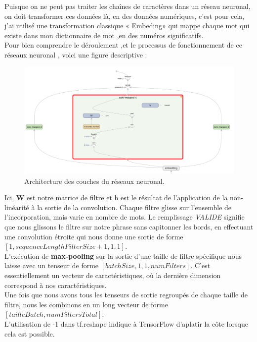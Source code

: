 Puisque on ne peut pas traiter les chaînes de caractères dans un réseau neuronal, on doit transformer ces données là, en des données numériques, c’est pour cela, j’ai utilisé une transformation classique « Embeding» qui mappe chaque mot qui existe dans mon dictionnaire de mot ,en des numéros significatifs.\\[0.2cm]
Pour bien comprendre le déroulement ,et le processus de fonctionnement de ce réseaux neuronal , voici une figure descriptive :

\begin{figure}[H]
	\begin{center}
	\includegraphics[width=\linewidth]{Images/cnn2.png}
	\end{center}
	\caption{Architecture des couches du réseaux neuronal.}
	\label{fig:cnn2}
\end{figure}

Ici, \textbf{W} est notre matrice de filtre et h est le résultat de l'application de la non-linéarité à la sortie de la convolution. Chaque filtre glisse sur l'ensemble de l'incorporation, mais varie en nombre de mots. Le remplissage \textit{VALIDE} signifie que nous glissons le filtre sur notre phrase sans capitonner les bords, en effectuant une convolution étroite qui nous donne une sortie de forme $ [1, sequenceLengthFilterSize+1, 1, 1] $.\\[0.2cm]
 L'exécution de \textbf{max-pooling} sur la sortie d'une taille de filtre spécifique nous laisse avec un tenseur de forme $ [batchSize, 1, 1, numFilters] $. C'est essentiellement un vecteur de caractéristiques, où la dernière dimension correspond à nos caractéristiques.\\[0.2cm]
Une fois que nous avons tous les tenseurs de sortie regroupés de chaque taille de filtre, nous les combinons en un long vecteur  de forme $ [tailleBatch, numFiltersTotal] $. \\[0.2cm]
L'utilisation de -1 dans tf.reshape indique à TensorFlow d'aplatir la côte lorsque cela est possible.\\[0.2cm]

